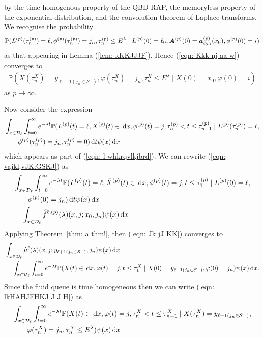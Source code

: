 by the time homogenous property of the QBD-RAP, the memoryless property of the exponential distribution, and the convolution theorem of Laplace transforms. We recognise the probability 
\begin{align}
	\mathbb P(L^{(p)}(\tau_n^{(p)}) = \ell, \phi^{(p)}(\tau_n^{(p)}) = j_n, \tau_{n}^{(p)}\leq E^\lambda 
	 \mid L^{(p)}(0)=\ell_0, \boldsymbol A^{(p)}(0)=\boldsymbol  a_{\ell_0,i}^{(p)}(x_0), \phi^{(p)}(0)=i) \label{eqn: Kkk nj aa w}
\end{align}
as that appearing in Lemma (\ref{lem: kKKJJJF}). Hence (\ref{eqn: Kkk nj aa w}) converges to 
\begin{align}
	\mathbb P(X(\tau_n^X) = y_{\ell+1(j_{n}\in\mathcal S_-)}, 
		\varphi(\tau_n^X) = j_n, \tau_{n}^X\leq E^\lambda
		\mid X(0)=x_0, \varphi(0)=i)
\end{align}
as \(p\to\infty\). 

Now consider the expression 
\begin{align}
	&\int_{x\in\mathcal{D}_\ell} \int_{t=0}^\infty e^{-\lambda t} \mathbb P(L^{(p)}(t) = \ell, \bar X^{(p)}(t) \in \, \mathrm{d} x, \phi^{(p)}(t) = j, 
	\tau_n^{(p)}<t \leq \tau_{n+1}^{(p)} \mid L^{(p)}(\tau_n^{(p)}) = \ell, \nonumber 
	 \\&\qquad{} \phi^{(p)}(\tau_n^{(p)}) = j_n,
	 	\tau_{n}^{(p)}= 0)\, \mathrm{d} t  \psi(x)\, \mathrm{d} x \label{eqn: vajkl;vJK:GSKJ}
\end{align}
which appears as part of (\ref{eqn: l whkrqvlkjbrd}). We can rewrite (\ref{eqn: vajkl;vJK:GSKJ}) as  
\begin{align}
	 &\int_{x\in\mathcal{D}_\ell} \int_{t=0}^\infty e^{-\lambda t} \mathbb P(L^{(p)}(t) = \ell, \bar X^{(p)}(t) \in \, \mathrm{d} x, \phi^{(p)}(t) = j, 
	t \leq \tau_{1}^{(p)} \mid L^{(p)}(0) = \ell, \nonumber 
	 \\&\qquad{} \phi^{(p)}(0) = j_n)\, \mathrm{d} t \psi(x)\, \mathrm{d} x\nonumber 
	 \\&= \int_{x\in\mathcal{D}_\ell} \widehat f^{\ell,(p)} (\lambda)(x,j;x_0,j_n) \psi(x)\, \mathrm{d} x \label{eqn: Jk jJ KK}
\end{align}
Applying Theorem~\ref{thm: a thm!}, then (\ref{eqn: Jk jJ KK}) converges to 
\begin{align}
	&\int_{x\in\mathcal{D}_\ell} \widehat \mu^{\ell} (\lambda)(x,j;y_{\ell+1(j_n\in\mathcal S_-)},j_n) \psi(x)\, \mathrm{d} x \nonumber 
	\\&= \int_{x\in\mathcal{D}_\ell} \int_{t=0}^\infty e^{-\lambda t}\mathbb P(X(t)\in\, \mathrm{d} x, \varphi(t)=j, t\leq \tau_1^X \mid X(0) = y_{\ell+1(j_n\in\mathcal S_-)}, \varphi(0)=j_n ) \psi(x)\, \mathrm{d} x. \label{eqn: lkHAHJFHKJ J J H}
\end{align}
Since the fluid queue is time homogeneous then we can write (\ref{eqn: lkHAHJFHKJ J J H}) as 
\begin{align}
	&\int_{x\in\mathcal{D}_\ell} \int_{t=0}^\infty e^{-\lambda t} \mathbb P(X(t)\in\, \mathrm{d} x, \varphi(t)=j, \tau_n^X < t \leq \tau_{n+1}^X \mid X(\tau_n^X) = y_{\ell+1(j_n\in\mathcal S_-)}, \nonumber 
	\\&\qquad{} \varphi(\tau_n^X)=j_n, \tau_n^X\leq E^\lambda ) \psi(x)\, \mathrm{d} x \label{eqn: lkHAHJFHKJ J J 22}
\end{align}

